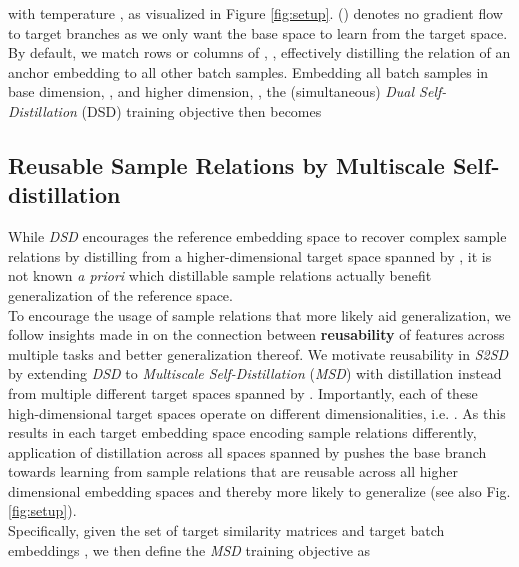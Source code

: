 \documentclass{article} \usepackage{arxiv_style,times}
\begin{document}
with temperature , as visualized in Figure \ref{fig:setup}. () denotes no gradient flow to target branches  as we only want the base space to learn from the target space.
By default, we match rows or columns of , , effectively distilling the relation of an anchor embedding  to all other batch samples. 
Embedding all batch samples in base dimension, , and higher dimension, , the (simultaneous) \emph{Dual Self-Distillation} (DSD) training objective then becomes








\subsection{Reusable Sample Relations by Multiscale Self-distillation}\label{sec:multi}
While \textit{DSD} encourages the reference embedding space to recover complex sample relations by distilling from a higher-dimensional target space spanned by , it is not known \textit{a priori} which distillable sample relations actually benefit generalization of the reference space.\\ 
To encourage the usage of sample relations that more likely aid generalization, we follow insights made in \cite{raghu2019rapid} on the connection between \textbf{reusability} of features across multiple tasks and better generalization thereof. We motivate reusability in \textit{S2SD} by extending \textit{DSD} to \emph{Multiscale Self-Distillation} (\textit{MSD}) with distillation instead from  multiple different target spaces spanned by . Importantly, each of these high-dimensional target spaces operate on different dimensionalities, i.e. . As this results in each target embedding space encoding sample relations differently, application of distillation across all spaces spanned by  pushes the base branch towards learning from sample relations that are reusable across all higher dimensional embedding spaces and thereby more likely to generalize (see also Fig. \ref{fig:setup}).\\
Specifically, given the set of target similarity matrices  and target batch embeddings , we then define the \textit{MSD} training objective as
\end{document}
